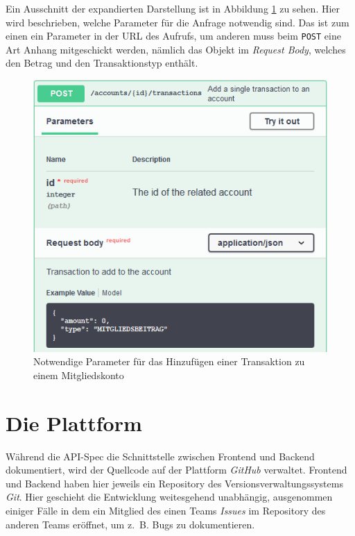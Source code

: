 \documentclass[a4paper, 11pt]{article}
\begin{document}
Ein Ausschnitt der expandierten Darstellung ist in Abbildung
\ref{fig:api_spec_post} zu sehen. Hier wird beschrieben, welche Parameter für
die Anfrage notwendig sind. Das ist zum einen ein Parameter in der URL des
Aufrufs, um anderen muss beim \texttt{POST} eine Art Anhang mitgeschickt
werden, nämlich das Objekt im \emph{Request Body}, welches den Betrag und den
Transaktionstyp enthält.

\begin{figure}[htpb]
    \centering
    \includegraphics{images/api_spec_example_post.png}
    \caption{Notwendige Parameter für das Hinzufügen einer Transaktion zu einem
    Mitgliedskonto}
    \label{fig:api_spec_post}
\end{figure}

\section{Die Plattform}

Während die API-Spec die Schnittstelle zwischen Frontend und Backend
dokumentiert, wird der Quellcode auf der Plattform \emph{GitHub} verwaltet.
Frontend und Backend haben hier jeweils ein Repository des
Versionsverwaltungssystems \emph{Git}. Hier geschieht die Entwicklung
weitesgehend unabhängig, ausgenommen einiger Fälle in dem ein Mitglied des
einen Teams \emph{Issues} im Repository des anderen Teams eröffnet, um z.~B.
Bugs zu dokumentieren.
\end{document}
